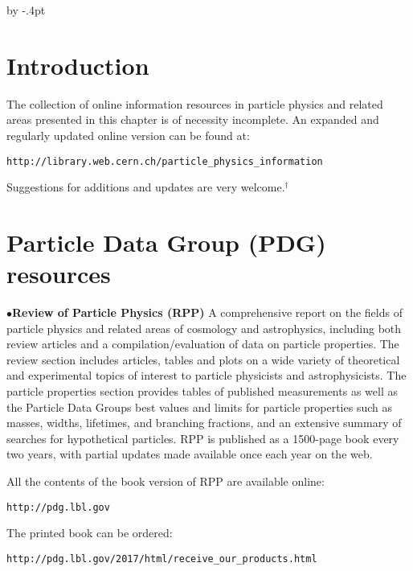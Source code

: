 %
\itemindent=10pt

\advance\baselineskip by -.4pt


\parindent=0pt
\def\url#1{\tt#1\rm}
\section{Introduction}%

The collection of online information resources in particle physics and related areas 
presented in this chapter is of necessity incomplete. An expanded and regularly updated 
online version can be found at: 

		\item{} \url{http://library.web.cern.ch/particle\_physics\_information}

Suggestions for additions and updates are very welcome.$^\dagger$ 

\vglue -0.1in
\section{Particle Data Group (PDG) resources}%

\item{$\bullet$}{\bf Review of Particle Physics (RPP)}
A comprehensive report on the fields of particle physics and related areas of cosmology and astrophysics, including both review articles and a compilation/evaluation of data on particle properties. The review section includes articles, tables and plots on a wide variety of theoretical and experimental topics of interest to particle physicists and astrophysicists. The particle properties section provides tables of published measurements as well as the Particle Data Groups best values and limits for particle properties such as masses, widths, lifetimes, and branching fractions, and an extensive summary of searches for hypothetical particles. RPP is published as a 1500-page book every two years, with partial updates made available once each year on the web.

\item{} All the contents of the book version of RPP are available online:

         \item{}\quad\url{http://pdg.lbl.gov}

\item{} The printed book can be ordered:

         \item{}\quad\url{http://pdg.lbl.gov/2017/html/receive\_our\_products.html}

